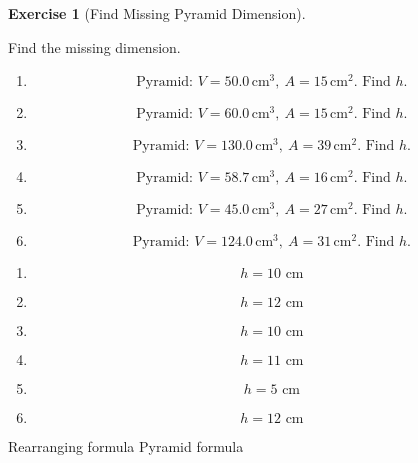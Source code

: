 \documentclass[
  letterpaper,
  DIV=11,
  numbers=noendperiod]{scrreprt}
\theoremstyle{definition}
\newtheorem{exercise}{Exercise}[chapter]
\theoremstyle{remark}
\begin{document}
\begin{exercise}[Find Missing Pyramid
Dimension]\protect\hypertarget{exr-cur-4}{}\label{exr-cur-4}

Find the missing dimension.

\begin{enumerate}
\def\labelenumi{\alph{enumi})}
\item
  \[\text{Pyramid: }V=50.0\,\text{cm}^{3},\ A=15\,\text{cm}^{2}\text{. Find }h.\]
\item
  \[\text{Pyramid: }V=60.0\,\text{cm}^{3},\ A=15\,\text{cm}^{2}\text{. Find }h.\]
\item
  \[\text{Pyramid: }V=130.0\,\text{cm}^{3},\ A=39\,\text{cm}^{2}\text{. Find }h.\]
\item
  \[\text{Pyramid: }V=58.7\,\text{cm}^{3},\ A=16\,\text{cm}^{2}\text{. Find }h.\]
\item
  \[\text{Pyramid: }V=45.0\,\text{cm}^{3},\ A=27\,\text{cm}^{2}\text{. Find }h.\]
\item
  \[\text{Pyramid: }V=124.0\,\text{cm}^{3},\ A=31\,\text{cm}^{2}\text{. Find }h.\]
\end{enumerate}

\begin{tcolorbox}[enhanced jigsaw, opacitybacktitle=0.6, coltitle=black, arc=.35mm, colframe=quarto-callout-tip-color-frame, colback=white, bottomrule=.15mm, left=2mm, colbacktitle=quarto-callout-tip-color!10!white, titlerule=0mm, opacityback=0, title=\textcolor{quarto-callout-tip-color}{\faLightbulb}\hspace{0.5em}{🔍 View Solution}, leftrule=.75mm, breakable, rightrule=.15mm, bottomtitle=1mm, toptitle=1mm, toprule=.15mm]

\begin{enumerate}
\def\labelenumi{\alph{enumi})}
\item
  \[h=10\text{ cm}\]
\item
  \[h=12\text{ cm}\]
\item
  \[h=10\text{ cm}\]
\item
  \[h=11\text{ cm}\]
\item
  \[h=5\text{ cm}\]
\item
  \[h=12\text{ cm}\]
\end{enumerate}

\end{tcolorbox}

{Rearranging formula} {Pyramid formula}

\end{exercise}
\end{document}
